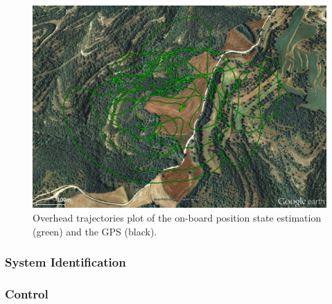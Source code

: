 \begin{figure}[tb]
    \centering
    \includegraphics[width=\linewidth]{images/10_real_time_state_estimator_position}
    \caption{Overhead trajectories plot of the on-board position state estimation (green) and the GPS  (black).}
    \label{fig:real_time_state_estimator_positionl}
\end{figure}


\subsubsection{System Identification} \label{sec:SystemID}
 
 
 \subsubsection{Control}

 

